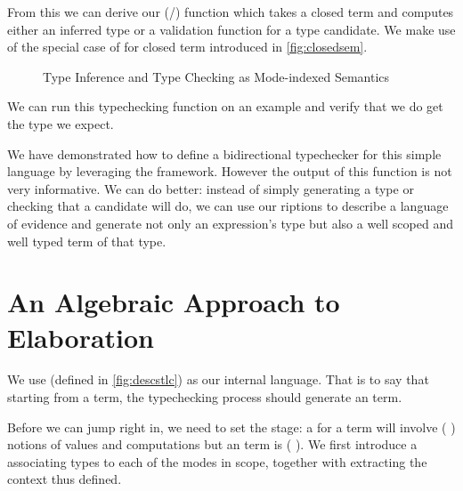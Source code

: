 From this we can derive our (/) function which takes
a closed term and computes either an inferred type or a validation function for a
type candidate. We make use of the special case of  for closed term
introduced in \cref{fig:closedsem}.

\begin{figure}[h]
\caption{Type Inference and Type Checking as Mode-indexed Semantics\label{fig:typeinfersem}}
\end{figure}

We can run this typechecking function on an example and verify that we do get the type
we expect.


We have demonstrated how to define a bidirectional typechecker for this simple language
by leveraging the  framework. However the output of this function is not
very informative. We can do better: instead of simply generating a type or checking that
a candidate will do, we can use our riptions to describe a language of evidence
and generate not only an expression's type but also a well scoped and well typed term of
that type.

\section{An Algebraic Approach to Elaboration}

We use  (defined in \cref{fig:descstlc}) as our internal language. That is to
say that starting from a  term, the typechecking process should generate an
 term.

Before we can jump right in, we need to set the stage: a  for a 
term will involve ({ }) notions of values and computations but an
 term is ({ }). We first introduce a  associating
types to each of the modes in scope, together with  extracting the context
thus defined.

\begin{figure}[h]
\begin{minipage}{0.4\textwidth}
\end{minipage}
\begin{minipage}{0.6\textwidth}
\end{minipage}
\end{figure}

